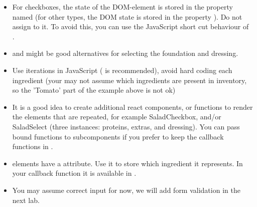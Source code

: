 \documentclass[fleqn, article, a4paper]{memoir}
\begin{document}
\begin{Assignments}
\begin{itemize}
  \item For checkboxes, the state of the DOM-element is stored in the property named  (for other  types, the DOM state is stored in the property ). Do not assign  to it. To avoid this, you can use the JavaScript short cut behaviour of \code{||} \\ .
  \item {} and  might be good alternatives for selecting the foundation and dressing.
  \item Use iterations in JavaScript ( is recommended), avoid hard coding each ingredient (your may not assume which ingredients are present in inventory, so the 'Tomato' part of the example above is not ok)
  \item It is a good idea to create additional react components, or functions to render the elements that are repeated, for example SaladCheckbox, and/or SaladSelect (three instances: proteins, extras, and dressing). You can pass bound functions to subcomponents if you prefer to keep the callback functions in .
  \item {} elements have a  attribute. Use it to store which ingredient it represents. In your callback function it is available in .
  \item You may assume correct input for now, we will add form validation in the next lab.
\end{itemize}


\end{Assignments}
\end{document}

